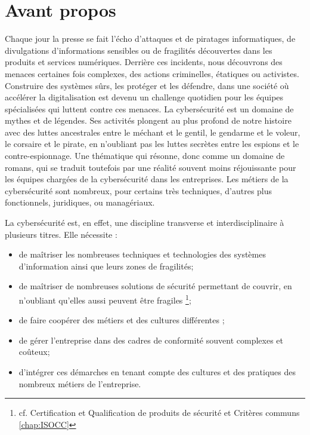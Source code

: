%
%


\section{Avant propos}

Chaque jour la presse se fait l'écho d'attaques et de piratages informatiques, de divulgations d'informations sensibles ou  de fragilités découvertes dans les produits et services numériques.
Derrière ces incidents, nous découvrons des menaces certaines fois complexes, des actions criminelles, étatiques ou activistes. Construire des systèmes sûrs, les protéger et les défendre, dans une société où accélérer la digitalisation est devenu un challenge quotidien pour les équipes spécialisées qui luttent contre ces menaces. 
La cybersécurité est un domaine de mythes et de légendes. Ses activités plongent au plus profond de notre histoire avec des luttes ancestrales entre le méchant et le gentil, le gendarme et le voleur, le corsaire et le pirate, en n'oubliant pas les luttes secrètes entre les espions et le contre-espionnage. Une thématique qui résonne, donc comme un domaine de romans, qui se traduit toutefois par une réalité souvent moins réjouissante pour les équipes chargées de la cybersécurité dans les entreprises. Les métiers de la cybersécurité sont nombreux, pour certains très techniques, d'autres plus fonctionnels, juridiques, ou managériaux. 

La cybersécurité est, en effet,  une discipline transverse et interdisciplinaire à plusieurs titres. Elle nécessite  :
\begin{itemize}
  \item de maîtriser les nombreuses techniques et technologies des systèmes d'information ainsi que leurs zones de fragilités;
  \item de maîtriser de nombreuses solutions de sécurité permettant de couvrir, en n'oubliant qu'elles aussi peuvent être fragiles \footnote{cf. Certification et Qualification de produits de sécurité et Critères communs \autoref{chap:ISOCC}};
  \item de faire coopérer des métiers et des cultures différentes ;
  \item de gérer l'entreprise dans des cadres de conformité souvent complexes et coûteux;
  \item d'intégrer ces démarches en tenant compte des cultures et des pratiques des nombreux métiers de l'entreprise.
\end{itemize}

